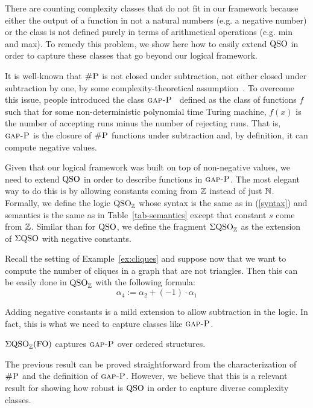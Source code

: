 There are counting complexity classes that do not fit in our framework because either the output of a function in not a natural numbers (e.g. a negative number) or the class is not defined purely in terms of arithmetical operations (e.g. min and max).
To remedy this problem, we show here how to easily extend ${\rm QSO}$ in order to capture these classes that go beyond our logical framework. 

It is well-known that $\text{\sc \#P}$ is not closed under subtraction, not either closed under subtraction by one, by some complexity-theoretical assumption~\cite{OH93}.
To overcome this issue, people introduced the class $\text{\sc gap-P}$~\cite{fenner1994gap} defined as the class of functions $f$ such that for some non-deterministic polynomial time Turing machine, $f(x)$ is the number of accepting runs minus the number of rejecting runs.
That is, $\text{\sc gap-P}$ is the closure of $\text{\sc \#P}$ functions under subtraction and, by definition, it can compute negative values. 

Given that our logical framework was built on top of non-negative values, we need to extend ${\rm QSO}$ in order to describe functions in $\text{\sc gap-P}$. 
The most elegant way to do this is by allowing constants coming from $\mathbb{Z}$ instead of just $\mathbb{N}$. 
Formally, we define the logic ${\rm QSO}_{\mathbb{Z}}$ whose syntax is the same as in (\ref{syntax}) and semantics is the same as in Table~\ref{tab-semantics} except that constant $s$ come from $\mathbb{Z}$.  
Similar than for ${\rm QSO}$, we define the fragment $\Sigma{\rm QSO}_{\mathbb{Z}}$ as the extension of $\Sigma{\rm QSO}$ with negative constants.
\begin{example}
	Recall the setting of Example~\ref{ex:cliques} and suppose now that we want to compute the number of cliques in a graph that are not triangles. Then this can be easily done in ${\rm QSO}_{\mathbb{Z}}$ with the following formula:
	\[
	\alpha_4 := \alpha_2 + (-1) \cdot \alpha_1 
	\]
\end{example}
Adding negative constants is a mild extension to allow subtraction in the logic. 
In fact, this is what we need to capture classes like $\text{\sc gap-P}$.
\begin{proposition} \label{prop:capture-gapp}
	$\Sigma{\rm QSO}_{\mathbb{Z}}({\rm FO})$ captures $\text{\sc gap-P}$ over ordered structures.
\end{proposition}
The previous result can be proved straightforward from the characterization of $\text{\sc \#P}$ and the definition of $\text{\sc gap-P}$. 
However, we believe that this is a relevant result for showing how robust is ${\rm QSO}$ in order to capture diverse complexity classes.
